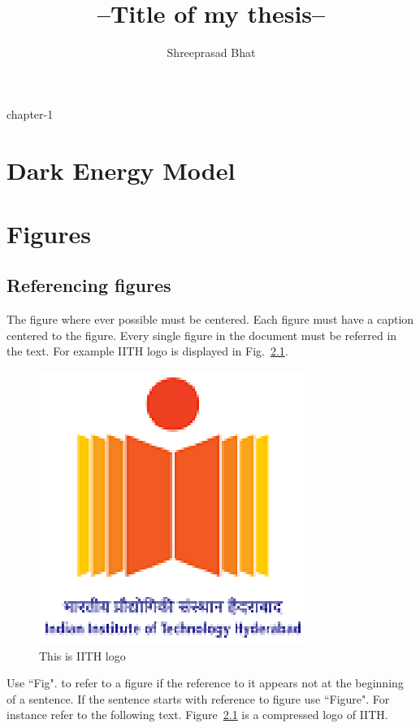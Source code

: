 \documentclass[a4paper,twoside]{iiththesis}
\title{--Title of my thesis--}
\author{Shreeprasad Bhat}
\begin{document}
\tableofcontents

{chapter-1}












\chapter{Dark Energy Model}

\chapter{Figures}
\section{Referencing figures}
The figure where ever possible must be centered. Each figure must have a caption centered to the figure. Every single figure in the document must be referred in the text. For example IITH logo is displayed in Fig.~\ref{iithlogo}.

\begin{figure}[h]
\centering
\includegraphics[scale=0.5]{logo}
\caption{This is IITH logo}
\label{iithlogo}
\end{figure}

Use ``Fig". to refer to a figure if the reference to it appears not at the beginning of a sentence. If the sentence starts with reference to figure use ``Figure". For instance refer to the following text.
Figure~\ref{iithlogo} is a compressed logo of IITH.\\
\end{document}
